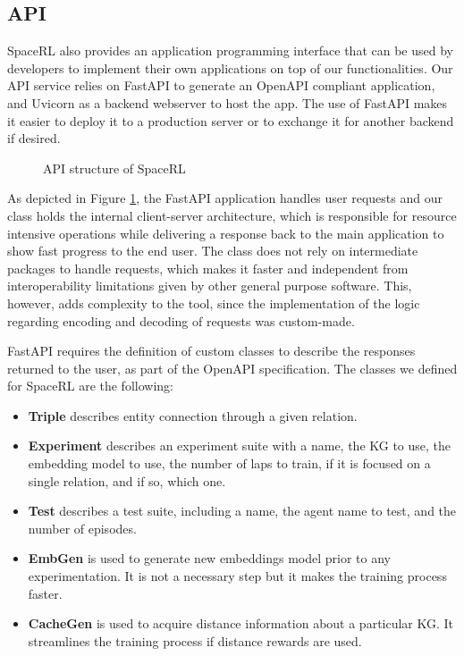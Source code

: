 
\subsection{API}
SpaceRL also provides an application programming interface that can be used by developers to implement their own applications on top of our functionalities. Our API service relies on FastAPI
to generate an OpenAPI
compliant application, and Uvicorn 
as a backend webserver to host the app. The use of FastAPI makes it easier to deploy it to a production server or to exchange it for another backend if desired.



\begin{figure}[!h]
    \centering
    
    \caption{API structure of SpaceRL}
    \label{fig:API_structure}
\end{figure}

As depicted in Figure \ref{fig:API_structure}, the FastAPI application handles user requests and our  class holds the internal client-server architecture, which is responsible for resource intensive operations while delivering a response back to the main application to show fast progress to the end user. The   class does not rely on intermediate packages to handle requests, which makes it faster and independent from interoperability limitations given by other general purpose software. This, however, adds complexity to the tool, since the implementation of the logic regarding encoding and decoding of requests was custom-made.

FastAPI requires the definition of custom classes to describe the responses returned to the user, as part of the OpenAPI specification. The classes we defined for SpaceRL are the following:

\begin{itemize}
    \item \textbf{Triple} describes entity connection through a given relation.
    \item \textbf{Experiment} describes an experiment suite with a name, the KG to use, the embedding model to use, the number of laps to train, if it is focused on a single relation, and if so, which one.
    \item \textbf{Test} describes a test suite, including a name, the agent name to test, and the number of episodes.
    \item \textbf{EmbGen} is used to generate new embeddings model prior to any experimentation. It is not a necessary step but it makes the training process faster.
    \item \textbf{CacheGen} is used to acquire distance information about a particular KG. It streamlines the training process if distance rewards are used.
\end{itemize}

